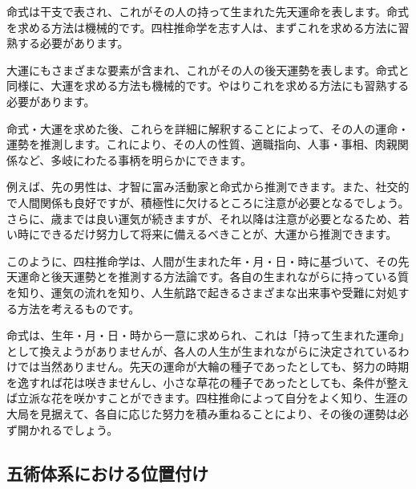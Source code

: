 \documentclass[a5paper,11pt,dvipdfmx]{tarticle}
\begin{document}
命式は干支で表され、これがその人の持って生まれた先天運命を表します。命式を求める方法は機械的です。四柱推命学を志す人は、まずこれを求める方法に習熟する必要があります。

大運にもさまざまな要素が含まれ、これがその人の後天運勢を表します。命式と同様に、大運を求める方法も機械的です。やはりこれを求める方法にも習熟する必要があります。

命式・大運を求めた後、これらを詳細に解釈することによって、その人の運命・運勢を推測します。これにより、その人の性質、適職指向、人事・事相、肉親関係など、多岐にわたる事柄を明らかにできます。

例えば、先の男性は、才智に富み活動家と命式から推測できます。また、社交的で人間関係も良好ですが、積極性に欠けるところに注意が必要となるでしょう。さらに、歳までは良い運気が続きますが、それ以降は注意が必要となるため、若い時にできるだけ努力して将来に備えるべきことが、大運から推測できます。

このように、四柱推命学は、人間が生まれた年・月・日・時に基づいて、その先天運命と後天運勢とを推測する方法論です。各自の生まれながらに持っている質を知り、運気の流れを知り、人生航路で起きるさまざまな出来事や受難に対処する方法を考えるものです。

命式は、生年・月・日・時から一意に求められ、これは「持って生まれた運命」として換えようがありませんが、各人の人生が生まれながらに決定されているわけでは当然ありません。先天の運命が大輪の種子であったとしても、努力の時期を逸すれば花は咲きませんし、小さな草花の種子であったとしても、条件が整えば立派な花を咲かすことができます。四柱推命によって自分をよく知り、生涯の大局を見据えて、各自に応じた努力を積み重ねることにより、その後の運勢は必ず開かれるでしょう。


\subsection{五術体系における位置付け}
\end{document}

